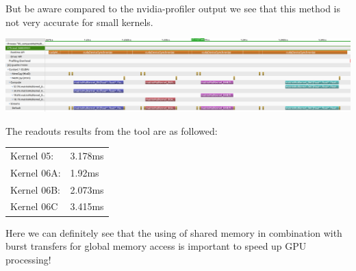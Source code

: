 But be aware compared to the nvidia-profiler output we see that this method is not very accurate for small kernels.

\includegraphics[width=\textwidth]{imgs/99_MatMulKernelComparison.png}

The readouts results from the tool are as followed:\\
\begin{tabular}{ll}
	Kernel 05: & 3.178ms\\
	Kernel 06A: & 1.92ms\\
	Kernel 06B: & 2.073ms\\
	Kernel 06C & 3.415ms\\
\end{tabular}

Here we can definitely see that the using of shared memory in combination with burst transfers for global memory access is important to speed up GPU processing! 
